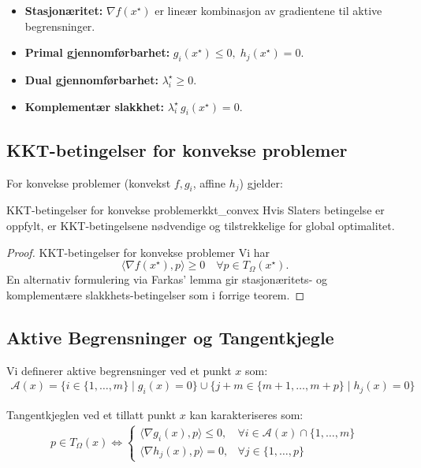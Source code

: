 \begin{itemize}
  \item \textbf{Stasjonæritet:} \(\nabla f(x^\star)\) er lineær kombinasjon av gradientene til aktive begrensninger.
  \item \textbf{Primal gjennomførbarhet:} \(g_i(x^\star)\le0,\;h_j(x^\star)=0\).
  \item \textbf{Dual gjennomførbarhet:} \(\lambda_i^\star\ge0\).
  \item \textbf{Komplementær slakkhet:} \(\lambda_i^\star\,g_i(x^\star)=0\).
\end{itemize}

\subsection{KKT-betingelser for konvekse problemer}

For konvekse problemer (konvekst \(f,g_i\), affine \(h_j\)) gjelder:

\begin{theorem}{KKT-betingelser for konvekse problemer}{kkt_convex}
  Hvis Slaters betingelse er oppfylt, er KKT-betingelsene nødvendige og tilstrekkelige for global optimalitet.
\end{theorem}

\begin{proof}{KKT-betingelser for konvekse problemer}{}
  Vi har
  \[
    \langle\nabla f(x^\star), p\rangle \ge0
      \quad\forall p\in T_\Omega(x^\star).
  \]
  En alternativ formulering via Farkas’ lemma gir stasjonæritets- og komplementære slakkhets-betingelser som i forrige teorem.
\end{proof}

\subsection{Aktive Begrensninger og Tangentkjegle}

Vi definerer aktive begrensninger ved et punkt $x$ som:
\begin{align*}
	\mathcal{A}(x) = \{i \in \{1,\ldots,m\} \mid g_i(x) = 0\} \cup \{j+m \in \{m+1,\ldots,m+p\} \mid h_j(x) = 0\}
\end{align*}

Tangentkjeglen ved et tillatt punkt $x$ kan karakteriseres som:
\begin{align*}
	p \in T_{\Omega}(x) \Longleftrightarrow
	\begin{cases}
		\langle \nabla g_i(x), p \rangle \leq 0, & \forall i \in \mathcal{A}(x) \cap \{1,\ldots,m\} \\
		\langle \nabla h_j(x), p \rangle = 0,    & \forall j \in \{1,\ldots,p\}
	\end{cases}
\end{align*}

